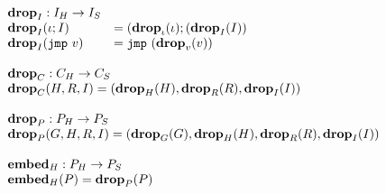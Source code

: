 {\[\begin{array}{l}
\begin{array}{ll}
\mathbf{drop}_{I} : {I_H} -> {I_S} \\
\mathbf{drop}_{I}(\iota ; I) &= (\mathbf{drop}_{\iota}(\iota) ; (\mathbf{drop}_{I}(I)) \\
\mathbf{drop}_{I}(\mathtt{jmp}\ v) &= \mathtt{jmp}\ (\mathbf{drop}_{v}(v))
\end{array} \\\\

\begin{array}{l}
\mathbf{drop}_{C} : {C_H} -> {C_S} \\
\mathbf{drop}_{C}(H, R, I) = (\mathbf{drop}_{H}(H), \mathbf{drop}_{R}(R), \mathbf{drop}_{I}(I)) \\\\

\mathbf{drop}_{P} : {P_H} -> {P_S} \\
\mathbf{drop}_{P}(G, H, R, I) = (\mathbf{drop}_{G}(G), \mathbf{drop}_{H}(H), \mathbf{drop}_{R}(R), \mathbf{drop}_{I}(I)) \\\\

{{\mathbf{embed}}_H} : {P_H} -> {P_S} \\
{{\mathbf{embed}}_H}(P) = \mathbf{drop}_{P}(P) \\
\end{array} \\\\

\end{array}\]
}
